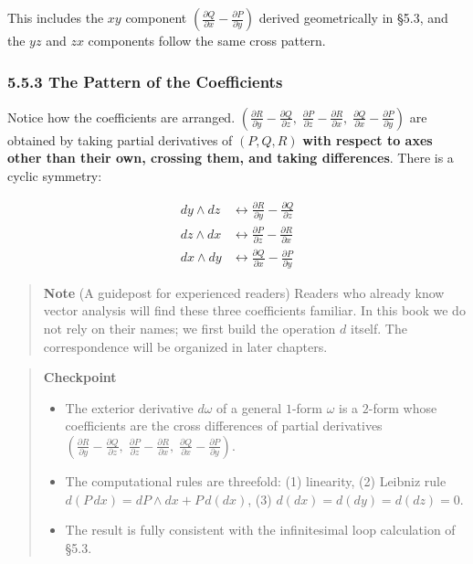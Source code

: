 \documentclass[a4paper,12pt,openany]{book}
\begin{document}
This includes the \(xy\) component
\((\frac{\partial Q}{\partial x}-\frac{\partial P}{\partial y})\)
derived geometrically in §5.3, and the \(yz\) and \(zx\) components
follow the same cross pattern.

\hypertarget{the-pattern-of-the-coefficients}{%
\subsubsection{5.5.3 The Pattern of the
Coefficients}\label{the-pattern-of-the-coefficients}}

Notice how the coefficients are arranged.
\((\frac{\partial R}{\partial y} - \frac{\partial Q}{\partial z},\; \frac{\partial P}{\partial z} - \frac{\partial R}{\partial x},\; \frac{\partial Q}{\partial x} - \frac{\partial P}{\partial y})\)
are obtained by taking partial derivatives of \((P, Q, R)\)
\textbf{with respect to axes other than their own, crossing them, and taking differences}.
There is a cyclic symmetry:

\[\begin{aligned}
dy \wedge dz &\longleftrightarrow \frac{\partial R}{\partial y} - \frac{\partial Q}{\partial z} \\
dz \wedge dx &\longleftrightarrow \frac{\partial P}{\partial z} - \frac{\partial R}{\partial x} \\
dx \wedge dy &\longleftrightarrow \frac{\partial Q}{\partial x} - \frac{\partial P}{\partial y}
\end{aligned}\]

\begin{quote}
\textbf{Note} (A guidepost for experienced readers) Readers who already
know vector analysis will find these three coefficients familiar. In
this book we do not rely on their names; we first build the operation
\(d\) itself. The correspondence will be organized in later chapters.
\end{quote}

\begin{quote}
\textbf{Checkpoint}

\begin{itemize}
\item
  The exterior derivative \(d\omega\) of a general \(1\)-form \(\omega\)
  is a \(2\)-form whose coefficients are the cross differences of
  partial derivatives
  \((\frac{\partial R}{\partial y}-\frac{\partial Q}{\partial z},\; \frac{\partial P}{\partial z}-\frac{\partial R}{\partial x},\; \frac{\partial Q}{\partial x}-\frac{\partial P}{\partial y})\).
\item
  The computational rules are threefold: (1) linearity, (2) Leibniz rule
  \(d(P\,dx) = dP \wedge dx + P\,d(dx)\), (3) \(d(dx)=d(dy)=d(dz)=0\).
\item
  The result is fully consistent with the infinitesimal loop calculation
  of §5.3.
\end{itemize}
\end{quote}
\end{document}
